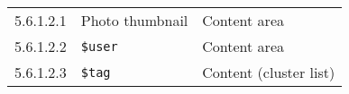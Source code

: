 \documentclass[11pt,a4paper]{article}
\newcommand{\var}[1]{\texttt{\${#1}}}
\begin{document}
\begin{center}
\begin{small}
\begin{longtable}{rll}
              5.6.1.2.1 &
              Photo thumbnail &
              Content area \\

              5.6.1.2.2 &
              \var{user} &
              Content area \\

              5.6.1.2.3 &
              \var{tag} &
              Content (cluster list) \\

    \end{longtable}
  \end{small}
\end{center}








%
%
%
%
\end{document}
